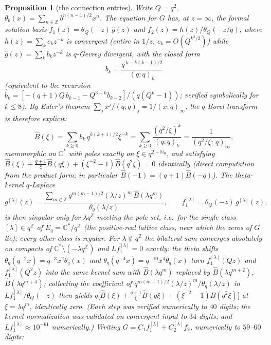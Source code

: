 \documentclass[11pt]{article}
\theoremstyle{plain}
\newtheorem{proposition}[theorem]{Proposition}
\theoremstyle{definition}
\theoremstyle{remark}
\newcommand{\Z}{\mathbb{Z}}
\newcommand{\C}{\mathbb{C}}
\begin{document}
\begin{proposition}[the connection entries]
\label{prop:pinned}
Write $Q=q^2$, $\theta_b(x)=\sum_{n\in\Z}b^{n(n-1)/2}x^n$. The equation for $G$ has, at $z=\infty$, the
formal solution basis $f_1(z)=\theta_Q(-z)\,\hat g(z)$ and $f_2(z)=h(z)/\theta_Q(-z/q)$, where
$h(z)=\sum_kc_kz^{-k}$ is \emph{convergent} (entire in $1/z$, $c_k=O(Q^{k^2/2})$) while
$\hat g(z)=\sum_kb_kz^{-k}$ is $q$-Gevrey divergent, with the closed form
\[
   b_k=\frac{q^{\,k-k(k-1)/2}}{(q;q)_k}
\]
(equivalent to the recursion $b_k=[-(q+1)Q\,b_{k-1}-Q^{3-k}b_{k-2}]/(q(Q^k-1))$; verified
symbolically for $k\le8$). By Euler's theorem $\sum_jx^j/(q;q)_j=1/(x;q)_\infty$, the $q$-Borel
transform is therefore explicit:
\[
   \widehat B(\xi)=\sum_{k\ge0}b_k\,q^{k(k+1)/2}\xi^{-k}
   =\sum_{k\ge0}\frac{(q^2/\xi)^k}{(q;q)_k}
   =\frac1{(q^2/\xi;\,q)_\infty},
\]
meromorphic on $\C^*$ with poles exactly on $\xi\in q^{2+\mathbb{N}_0}$, and satisfying
$\widehat B(\xi)+\tfrac{q+1}{\xi}\widehat B(q\xi)+(\xi^{-2}-1)\widehat B(q^2\xi)=0$ identically
(direct computation from the product form; in particular $\widehat B(-1)=(q+1)\widehat B(-q)$). The
theta-kernel $q$-Laplace
\[
   g^{[\lambda]}(z)=\frac{\sum_{m\in\Z}q^{m(m-1)/2}(\lambda/z)^m\,\widehat B(\lambda q^m)}
        {\theta_q(\lambda/z)},\qquad
   f_1^{[\lambda]}=\theta_Q(-z)\,g^{[\lambda]}(z),
\]
is then singular only for $\lambda q^{\Z}$ meeting the pole set, i.e.\ for the single class
$[\lambda]\in q^{\Z}$ of $E_q=\C^*/q^{\Z}$ (the positive-real lattice class, near which the zeros of
$G$ lie); every other class is regular. For $\lambda\notin q^{\Z}$ the bilateral sum converges
absolutely on compacts of $\C^*\setminus(-\lambda q^{\Z})$ and $Lf_1^{[\lambda]}=0$ \emph{exactly}:
the theta shifts $\theta_q(q^{-2}x)=q^{-3}x^2\theta_q(x)$ and $\theta_q(q^{-4}x)=q^{-10}x^4\theta_q(x)$
turn $f_1^{[\lambda]}(Qz)$ and $f_1^{[\lambda]}(Q^2z)$ into the same kernel sum with
$\widehat B(\lambda q^m)$ replaced by $\widehat B(\lambda q^{m+2})$, $\widehat B(\lambda q^{m+4})$;
collecting the coefficient of $q^{m(m-1)/2}(\lambda/z)^m/\theta_q(\lambda/z)$ in
$Lf_1^{[\lambda]}/\theta_Q(-z)$ then yields
$q\bigl[\widehat B(\xi)+\tfrac{q+1}{\xi}\widehat B(q\xi)+(\xi^{-2}-1)\widehat B(q^2\xi)\bigr]$ at
$\xi=\lambda q^m$, identically zero. (Each step was verified numerically to $40$ digits; the kernel
normalization was validated on convergent input to $34$ digits, and $Lf_1^{[\lambda]}\approx10^{-61}$
numerically.) Writing
$G=C_1f_1^{[\lambda]}+C_2^{[\lambda]}f_2$, numerically to $59$--$60$ digits:
\begin{itemize}

\end{itemize}
\end{proposition}
\end{document}
